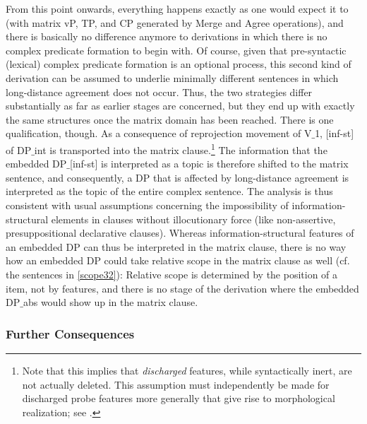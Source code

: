 \documentclass[output=paper
,modfonts
,nonflat]{langsci/langscibook}
\begin{document}
From this point onwards, everything happens exactly as one would
expect it to (with matrix vP, TP, and CP generated by Merge and Agree
operations), and there is basically no difference anymore to
derivations in which there is no complex predicate formation to begin
with.  Of course, given that pre-syntactic (lexical) complex predicate
formation is an optional process, this second kind of derivation can
be assumed to underlie minimally different sentences in which
long-distance agreement does not occur. Thus, the two strategies
differ substantially as far as earlier stages are concerned, but they
end up with exactly the same structures once the matrix domain has
been reached. There is one qualification, though. 
 As a consequence of reprojection movement of V$\_$1, [inf-st] of
 DP$\_${int} is
  transported into the matrix clause.\footnote{Note that this implies
    that {\itshape discharged} features, while syntactically inert, are not
    actually deleted. This assumption
    must independently be made for
    discharged probe features more generally that give rise to
    morphological realization; see \cite{Adger:03}.} 
The information that the embedded DP$\_${\rm [inf-st]}
  is interpreted as a topic is therefore shifted to the matrix
  sentence, and consequently, a DP that is affected by long-distance
  agreement is interpreted as the topic of the entire complex sentence.
 The analysis is thus consistent with usual assumptions concerning the impossibility
  of information-struc\-tural elements in clauses without
  illocutionary force (like non-assertive, presuppositional
  declarative clauses). Whereas information-structural features of an
  embedded DP can thus be interpreted in the matrix clause, there is
  no way how an embedded DP could take relative scope in the matrix clause as
  well (cf. the sentences in \ref{scope32}): Relative scope is
  determined by the position of a item, not by features, and there is no stage of
  the derivation where the embedded DP$\_${abs} would show up in the
  matrix clause. 

\subsubsection{Further Consequences}
\end{document}
